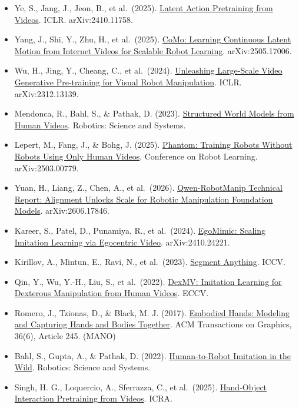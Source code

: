 \begin{itemize}
\item
  Ye, S., Jang, J., Jeon, B., et al.~(2025). \href{https://openreview.net/forum?id=VYOe2eBQeh}{Latent Action Pretraining from Videos}. ICLR. arXiv:2410.11758.
\item
  Yang, J., Shi, Y., Zhu, H., et al.~(2025). \href{https://arxiv.org/abs/2505.17006}{CoMo: Learning Continuous Latent Motion from Internet Videos for Scalable Robot Learning}. arXiv:2505.17006.
\item
  Wu, H., Jing, Y., Cheang, C., et al.~(2024). \href{https://openreview.net/forum?id=NxoFmGgWC9}{Unleashing Large-Scale Video Generative Pre-training for Visual Robot Manipulation}. ICLR. arXiv:2312.13139.
\item
  Mendonca, R., Bahl, S., \& Pathak, D. (2023). \href{https://arxiv.org/abs/2308.10901}{Structured World Models from Human Videos}. Robotics: Science and Systems.
\item
  Lepert, M., Fang, J., \& Bohg, J. (2025). \href{https://proceedings.mlr.press/v305/lepert25a.html}{Phantom: Training Robots Without Robots Using Only Human Videos}. Conference on Robot Learning. arXiv:2503.00779.
\item
  Yuan, H., Liang, Z., Chen, A., et al.~(2026). \href{https://arxiv.org/abs/2606.17846}{Qwen-RobotManip Technical Report: Alignment Unlocks Scale for Robotic Manipulation Foundation Models}. arXiv:2606.17846.
\item
  Kareer, S., Patel, D., Punamiya, R., et al.~(2024). \href{https://arxiv.org/abs/2410.24221}{EgoMimic: Scaling Imitation Learning via Egocentric Video}. arXiv:2410.24221.
\item
  Kirillov, A., Mintun, E., Ravi, N., et al.~(2023). \href{https://openaccess.thecvf.com/content/ICCV2023/html/Kirillov_Segment_Anything_ICCV_2023_paper.html}{Segment Anything}. ICCV.
\item
  Qin, Y., Wu, Y.-H., Liu, S., et al.~(2022). \href{https://arxiv.org/abs/2108.05877}{DexMV: Imitation Learning for Dexterous Manipulation from Human Videos}. ECCV.
\item
  Romero, J., Tzionas, D., \& Black, M. J. (2017). \href{https://doi.org/10.1145/3130800.3130883}{Embodied Hands: Modeling and Capturing Hands and Bodies Together}. ACM Transactions on Graphics, 36(6), Article 245. (MANO)
\item
  Bahl, S., Gupta, A., \& Pathak, D. (2022). \href{https://arxiv.org/abs/2207.09450}{Human-to-Robot Imitation in the Wild}. Robotics: Science and Systems.
\item
  Singh, H. G., Loquercio, A., Sferrazza, C., et al.~(2025). \href{https://arxiv.org/abs/2409.08273}{Hand-Object Interaction Pretraining from Videos}. ICRA.

\end{itemize}

